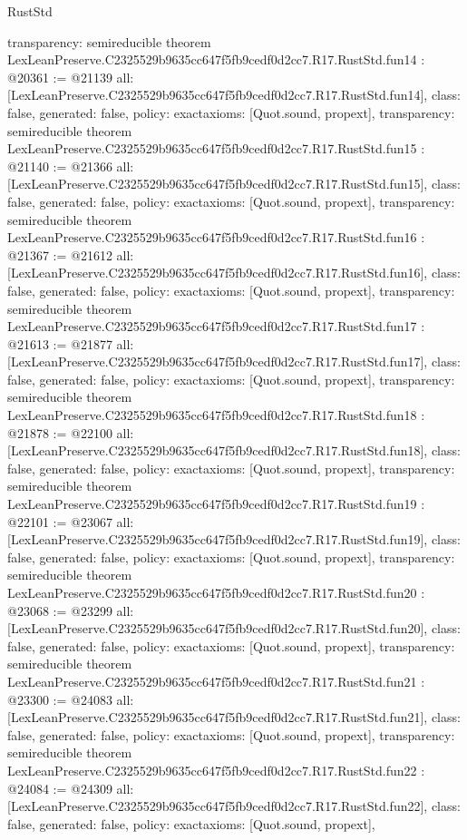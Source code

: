 \begin{lexlean}{RustStd}
\begin{coremodule}
{  transparency: semireducible
}
theorem LexLeanPreserve.C2325529b9635cc647f5fb9cedf0d2cc7.R17.RustStd.fun14 : @20361 := @21139 {
  all: [LexLeanPreserve.C2325529b9635cc647f5fb9cedf0d2cc7.R17.RustStd.fun14],
  class: false,
  generated: false,
  policy: exact{axioms: [Quot.sound, propext]},
  transparency: semireducible
}
theorem LexLeanPreserve.C2325529b9635cc647f5fb9cedf0d2cc7.R17.RustStd.fun15 : @21140 := @21366 {
  all: [LexLeanPreserve.C2325529b9635cc647f5fb9cedf0d2cc7.R17.RustStd.fun15],
  class: false,
  generated: false,
  policy: exact{axioms: [Quot.sound, propext]},
  transparency: semireducible
}
theorem LexLeanPreserve.C2325529b9635cc647f5fb9cedf0d2cc7.R17.RustStd.fun16 : @21367 := @21612 {
  all: [LexLeanPreserve.C2325529b9635cc647f5fb9cedf0d2cc7.R17.RustStd.fun16],
  class: false,
  generated: false,
  policy: exact{axioms: [Quot.sound, propext]},
  transparency: semireducible
}
theorem LexLeanPreserve.C2325529b9635cc647f5fb9cedf0d2cc7.R17.RustStd.fun17 : @21613 := @21877 {
  all: [LexLeanPreserve.C2325529b9635cc647f5fb9cedf0d2cc7.R17.RustStd.fun17],
  class: false,
  generated: false,
  policy: exact{axioms: [Quot.sound, propext]},
  transparency: semireducible
}
theorem LexLeanPreserve.C2325529b9635cc647f5fb9cedf0d2cc7.R17.RustStd.fun18 : @21878 := @22100 {
  all: [LexLeanPreserve.C2325529b9635cc647f5fb9cedf0d2cc7.R17.RustStd.fun18],
  class: false,
  generated: false,
  policy: exact{axioms: [Quot.sound, propext]},
  transparency: semireducible
}
theorem LexLeanPreserve.C2325529b9635cc647f5fb9cedf0d2cc7.R17.RustStd.fun19 : @22101 := @23067 {
  all: [LexLeanPreserve.C2325529b9635cc647f5fb9cedf0d2cc7.R17.RustStd.fun19],
  class: false,
  generated: false,
  policy: exact{axioms: [Quot.sound, propext]},
  transparency: semireducible
}
theorem LexLeanPreserve.C2325529b9635cc647f5fb9cedf0d2cc7.R17.RustStd.fun20 : @23068 := @23299 {
  all: [LexLeanPreserve.C2325529b9635cc647f5fb9cedf0d2cc7.R17.RustStd.fun20],
  class: false,
  generated: false,
  policy: exact{axioms: [Quot.sound, propext]},
  transparency: semireducible
}
theorem LexLeanPreserve.C2325529b9635cc647f5fb9cedf0d2cc7.R17.RustStd.fun21 : @23300 := @24083 {
  all: [LexLeanPreserve.C2325529b9635cc647f5fb9cedf0d2cc7.R17.RustStd.fun21],
  class: false,
  generated: false,
  policy: exact{axioms: [Quot.sound, propext]},
  transparency: semireducible
}
theorem LexLeanPreserve.C2325529b9635cc647f5fb9cedf0d2cc7.R17.RustStd.fun22 : @24084 := @24309 {
  all: [LexLeanPreserve.C2325529b9635cc647f5fb9cedf0d2cc7.R17.RustStd.fun22],
  class: false,
  generated: false,
  policy: exact{axioms: [Quot.sound, propext]},
}
\end{coremodule}
\end{lexlean}
